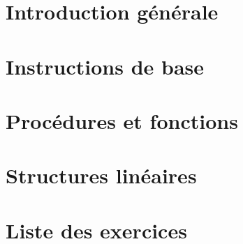 \documentclass[11pt,a4paper,colorlinks,breaklinks]{book}
\theoremstyle{mybreak}
\begin{document}
\renewcommand{\contentsname}{Sommaire}
\tableofcontents

\chapter{Introduction générale}\label{ch:introduction}
	

\chapter{Instructions de base}\label{ch:instructions}
	

\chapter{Procédures et fonctions}\label{ch:fonctions}
	

\chapter{Structures linéaires}\label{ch:listes}
	



\appendix

%	

\chapter*{Liste des exercices}


\label{fin}
\end{document}
